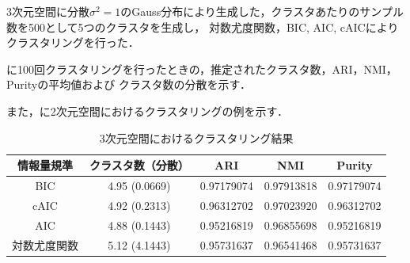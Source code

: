 3次元空間に分散$\sigma^2=1$のGauss分布により生成した，クラスタあたりのサンプル数を500として5つのクラスタを生成し，
対数尤度関数，BIC, AIC, cAICによりクラスタリングを行った．

に100回クラスタリングを行ったときの，推定されたクラスタ数，ARI，NMI，Purityの平均値および
クラスタ数の分散を示す．

また，に2次元空間におけるクラスタリングの例を示す．

\begin{table}[htb]
  \centering
  \caption{3次元空間におけるクラスタリング結果}
  \label{table:3dim}
  \begin{tabular}{|c|c|c|c|c|} \hline
    情報量規準 & クラスタ数（分散） & ARI & NMI & Purity \\\hline
    BIC & 4.95 (0.0669) & 0.97179074 & 0.97913818 & 0.97179074\\
    cAIC & 4.92 (0.2313) & 0.96312702 & 0.97023920 & 0.96312702\\
    AIC & 4.88 (0.1443) & 0.95216819 & 0.96855698 & 0.95216819\\
    対数尤度関数 & 5.12 (4.1443) & 0.95731637 & 0.96541468 & 0.95731637\\\hline 
  \end{tabular}
\end{table}
